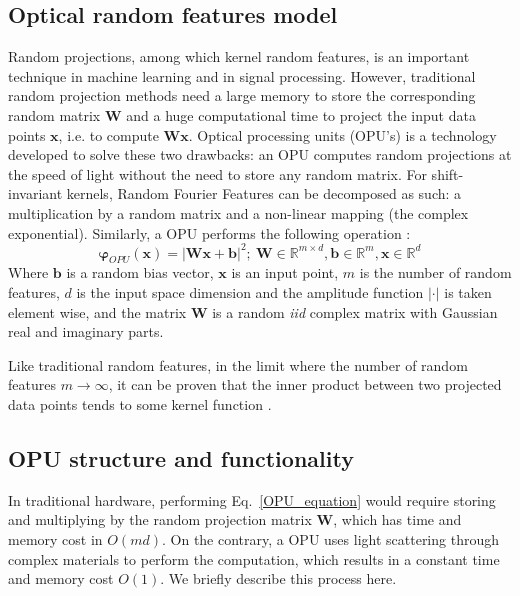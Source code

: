 \subsection{Optical random features model}
Random projections, among which kernel random features, is an important technique in machine learning and in signal processing. However, traditional random projection methods need a large memory to store the corresponding random matrix $\mathbf{W}$ and a huge computational time to project the input data points $\mathbf{x}$, i.e. to compute $\mathbf{Wx}$. Optical processing units (OPU's) is a technology developed to solve these two drawbacks: an OPU computes random projections at the speed of light without the need to store any random matrix. For shift-invariant kernels, Random Fourier Features can be decomposed as such: a multiplication by a random matrix and a non-linear mapping (the complex exponential).
Similarly, a OPU performs the following operation \citep{saade_opu}:
\begin{equation}
\label{OPU_equation}
\mathbf{\varphi}_{OPU}(\mathbf{x})=|\mathbf{Wx+b}|^2 ;~\mathbf{W}\in \mathbb{R}^{m\times d},\mathbf{b}\in \mathbb{R}^m, \mathbf{x}\in \mathbb{R}^d
\end{equation}
Where $\mathbf{b}$ is a random bias vector, $\mathbf{x}$ is an input point, $m$ is the number of random features, $d$ is the input space dimension and the amplitude function $|\cdot|$ is taken element wise, and the matrix $\mathbf{W}$ is a random \emph{iid} complex matrix with Gaussian real and imaginary parts.

Like traditional random features, in the limit where the number of random features $m\xrightarrow{}\infty$, it can be proven that the inner product between two projected data points tends to some kernel function \citep{saade_opu}.

\subsection{OPU structure and functionality}
In traditional hardware, performing Eq.~\eqref{OPU_equation} would require storing and multiplying by the random projection matrix $\mathbf{W}$, which has time and memory cost in $O(md)$. On the contrary, a OPU uses light scattering through complex materials to perform the computation, which results in a constant time and memory cost $O(1)$. We briefly describe this process here.

